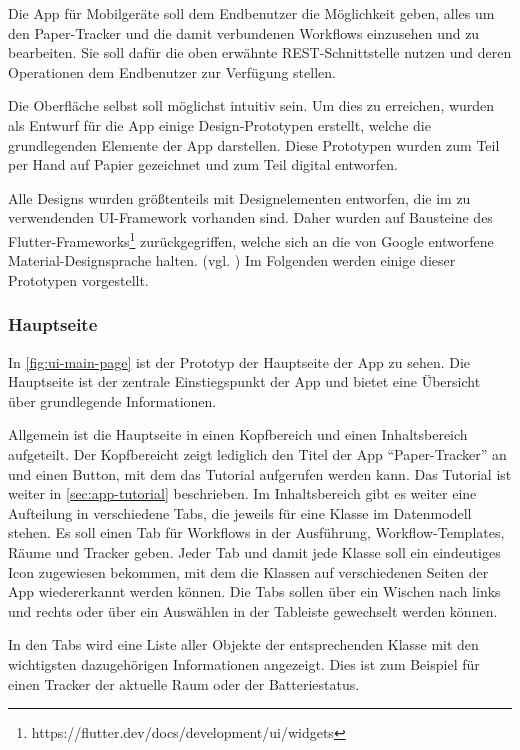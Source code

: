 Die App für Mobilgeräte soll dem Endbenutzer die Möglichkeit geben, alles um den Paper-Tracker und die damit verbundenen Workflows einzusehen und zu bearbeiten.
Sie soll dafür die oben erwähnte \gls{REST}-Schnittstelle nutzen und deren Operationen dem Endbenutzer zur Verfügung stellen.

Die Oberfläche selbst soll möglichst intuitiv sein.
Um dies zu erreichen, wurden als Entwurf für die App einige Design-Prototypen erstellt, welche die grundlegenden Elemente der App darstellen.
Diese Prototypen wurden zum Teil per Hand auf Papier gezeichnet und zum Teil digital entworfen.

Alle Designs wurden größtenteils mit Designelementen entworfen, die im zu verwendenden \gls{UI}-Framework vorhanden sind.
Daher wurden auf Bausteine des
Flutter-Frameworks\footnote{https://flutter.dev/docs/development/ui/widgets} zurückgegriffen, welche
sich an die von Google entworfene Material-Designsprache halten. (vgl. \cite{Google2020})
Im Folgenden werden einige dieser Prototypen vorgestellt.

\FloatBarrier
\subsubsection{Hauptseite}

In \autoref{fig:ui-main-page} ist der Prototyp der Hauptseite der App zu sehen.
Die Hauptseite ist der zentrale Einstiegspunkt der App und bietet eine Übersicht über grundlegende
Informationen.

Allgemein ist die Hauptseite in einen Kopfbereich und einen Inhaltsbereich aufgeteilt.
Der Kopfbereicht zeigt lediglich den Titel der App \enquote{Paper-Tracker} an und einen Button, mit dem das Tutorial aufgerufen werden kann.
Das Tutorial ist weiter in \autoref{sec:app-tutorial} beschrieben.
Im Inhaltsbereich gibt es weiter eine Aufteilung in verschiedene Tabs, die jeweils für eine Klasse im Datenmodell stehen.
Es soll einen Tab für Workflows in der Ausführung, Workflow-Templates, Räume und Tracker geben.
Jeder Tab und damit jede Klasse soll ein eindeutiges Icon zugewiesen bekommen, mit dem die Klassen auf verschiedenen Seiten der App wiedererkannt werden können.
Die Tabs sollen über ein Wischen nach links und rechts oder über ein Auswählen in der Tableiste gewechselt werden können.

In den Tabs wird eine Liste aller Objekte der entsprechenden Klasse mit den wichtigsten dazugehörigen Informationen angezeigt.
Dies ist zum Beispiel für einen Tracker der aktuelle Raum oder der Batteriestatus.

